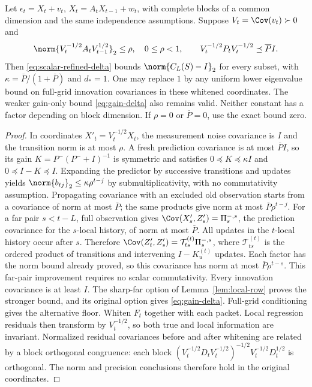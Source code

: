 \begin{theorem}
\label{thm:block-locality}
Let $\epsilon_t=X_t+v_t$, $X_t=A_tX_{t-1}+w_t$, with complete blocks of
a common dimension and the same independence assumptions. Suppose
$V_t=\Cov(v_t)\succ0$ and
\begin{equation}
 \norm{V_t^{-1/2}A_tV_{t-1}^{1/2}}_2\le\rho,\quad 0\le\rho<1,\qquad
 V_t^{-1/2}P_tV_t^{-1/2}\preceq\overline P I.
 \label{eq:block-promises}
\end{equation}
Then \eqref{eq:scalar-refined-delta} bounds $\norm{C_L(S)-I}_2$ for every subset,
with $\kappa=\overline P/(1+\overline P)$ and $d_*=1$.
One may replace $1$ by any uniform lower eigenvalue bound on full-grid
innovation covariances in these whitened coordinates. The weaker gain-only
bound \eqref{eq:gain-delta} also remains valid. Neither constant has a
factor depending on block dimension.
If $\rho=0$ or $\overline P=0$, use the exact bound zero.
\end{theorem}
\begin{proof}
In coordinates $X'_t=V_t^{-1/2}X_t$, the measurement noise covariance is $I$
and the transition norm is at most $\rho$. A fresh prediction covariance
is at most $\overline P I$, so its gain
$K=P^-(P^-+I)^{-1}$ is symmetric and satisfies
$0\preceq K\preceq\kappa I$ and $0\preceq I-K\preceq I$.
Expanding the predictor by successive transitions and updates yields
$\norm{b_{tj}}_2\le\kappa\rho^{t-j}$ by submultiplicativity, with no
commutativity assumption. Propagating covariance with an excluded old
observation starts from a covariance of norm at most $\overline P$;
the same products give norm at most $\overline P\rho^{t-j}$.
For a far pair $s<t-L$, full observation gives
$\Cov(X'_s,Z'_s)=\Pi_s^{-,s}$, the prediction covariance for the
$s$-local history, of norm at most $\overline P$. All updates in the
$t$-local history occur after $s$. Therefore
$\Cov(Z'_t,Z'_s)=\mathcal T_{ts}^{(t)}\Pi_s^{-,s}$, where
$\mathcal T_{ts}^{(t)}$ is the ordered product of transitions and
intervening $I-K_u^{(t)}$ updates. Each factor has the norm bound already
proved, so this covariance has norm at most $\overline P\rho^{t-s}$.
This far-pair improvement requires no scalar commutativity.
Every innovation covariance is at least $I$. The sharp-far option of
Lemma~\ref{lem:local-row} proves the stronger bound, and its original
option gives \eqref{eq:gain-delta}. Full-grid conditioning gives the
alternative floor.
Whiten $F_t$ together with each packet. Local regression residuals then
transform by $V_t^{-1/2}$, so both true and local information are invariant.
Normalized residual covariances before and after whitening are related by
a block orthogonal congruence: each block
$(V_t^{-1/2}D_tV_t^{-1/2})^{-1/2}V_t^{-1/2}D_t^{1/2}$ is orthogonal.
The norm and precision conclusions therefore hold in the original coordinates.
\end{proof}

